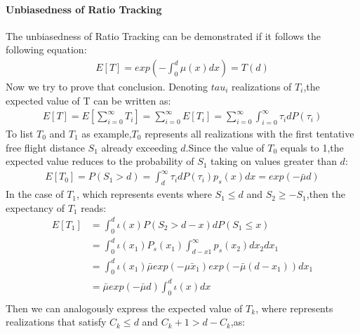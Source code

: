 \documentclass[acmtog]{acmart}
\begin{document}
\paragraph {\textbf{Unbiasedness of Ratio Tracking}}
The unbiasedness of Ratio Tracking can be demonstrated if it follows the following equation:
\begin{equation}
	\begin{aligned}
		E[T] = exp(-\int_{0}^{d}\mu(x)dx) = T(d)
	\end{aligned}
\end{equation}
Now we try to prove that conclusion.
Denoting $tau_i$ realizations of $T_i$,the expected value of T can be written as:
\begin{equation}
	\begin{aligned}
		E[T] = E[\sum_{i=0}^{\infty}T_i]=\sum_{i=0}^{\infty}E[T_i]=\sum_{i=0}^{\infty}\int_{i=0}^{\infty}\tau_i dP(\tau_i)
	\end{aligned}
\end{equation}
To list $T_0$ and $T_1$ as example,$T_0$ represents all realizations with the first tentative free flight distance $S_1$ already exceeding $d$.Since the value of $T_0$ equals to 1,the expected value reduces to the probability of $S_1$ taking on values greater than $d$:
\begin{equation}
	\begin{aligned}
		E[T_0] = P(S_1> d) = \int_{d}^{\infty}\tau_i dP(\tau_i)p_s(x)dx = exp(-\bar{\mu}d)
	\end{aligned}
\end{equation}
In the case of $T_1$, which represents events where $S_1 \leq d$ and $S_2 \geq -S_1$,then the expectancy of $T_1$ reads:
\begin{equation}
	\begin{aligned}
		E[T_1] &= \int_{0}^{d}\iota(x) P(S_2>d-x)dP(S_1\leq x)\\
		&= \int_{0}^{d}\iota(x_1) P_s(x_1)\int_{d-x1}^{\infty}p_s(x_2)dx_2dx_1\\
		&= \int_{0}^{d}\iota(x_1) \bar{\mu} exp(-\bar{\mu x_1})exp(-\bar \mu(d-x_1))dx_1\\
		&=\bar{\mu}exp(-\bar{\mu}d)\int_{0}^{d}\iota(x)dx\\
	\end{aligned}
\end{equation}
Then we can analogously express the expected value of $T_k$, where represents realizations that satisfy $C_k \leq d$ and $C_k+1 >d-C_k$,as:
\end{document}
